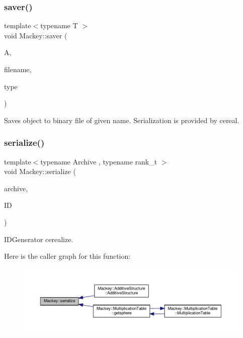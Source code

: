 \subsubsection{\texorpdfstring{saver()}{saver()}}
{\footnotesize\ttfamily template$<$typename T $>$ \\
void Mackey\+::saver (\begin{DoxyParamCaption}\item[{const T \&}]{A,  }\item[{const std\+::string \&}]{filename,  }\item[{const std\+::string \&}]{type }\end{DoxyParamCaption})}



Saves object to binary file of given name. Serialization is provided by cereal. 

\mbox{\label{namespaceMackey_ac78e550c9949977ed71367fb21892e93}} 
\subsubsection{\texorpdfstring{serialize()}{serialize()}\hspace{0.1cm}{\footnotesize\ttfamily [1/5]}}
{\footnotesize\ttfamily template$<$typename Archive , typename rank\+\_\+t $>$ \\
void Mackey\+::serialize (\begin{DoxyParamCaption}\item[{Archive \&}]{archive,  }\item[{\hyperlink{classMackey_1_1IDGenerators}{I\+D\+Generators}$<$ rank\+\_\+t $>$ \&}]{ID }\end{DoxyParamCaption})}



I\+D\+Generator cerealize. 

Here is the caller graph for this function\+:\nopagebreak
\begin{figure}[H]
\begin{center}
\leavevmode
\includegraphics[width=350pt]{namespaceMackey_ac78e550c9949977ed71367fb21892e93_icgraph}
\end{center}
\end{figure}
\mbox{\label{namespaceMackey_aa1f463e9991b727f5c74e430eccee044}} 
